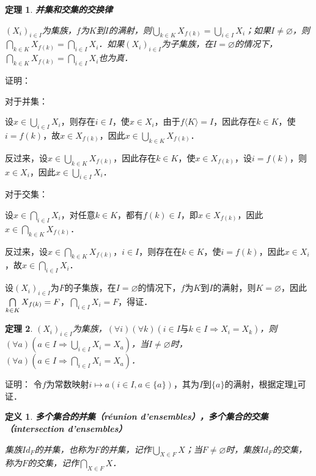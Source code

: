 \documentclass[12pt, a4paper, oneside]{book}
\newtheorem{theo}{定理}
\newtheorem{de}{定义}
\begin{document}
			\begin{theo}\label{theo23}
				\textbf{并集和交集的交换律}
				\par
				$(X_i)_{i\in I}$为集族，$f$为$K$到$I$的满射，则$\bigcup\limits_{k\in K}X_{f(k)}=\bigcup\limits_{i\in I}X_i$；如果$I\neq \varnothing$，则$\bigcap\limits_{k\in K}X_{f(k)}=\bigcap\limits_{i\in I}X_i$．如果$(X_i)_{i\in I}$为子集族，在$I=\varnothing$的情况下，$\bigcap\limits_{k\in K}X_{f(k)}=\bigcap\limits_{i\in I}X_i$也为真．
			\end{theo}
			证明：
			\par
			对于并集：
			\par
			设$x\in \bigcup\limits_{i\in I}X_i$，则存在$i\in I$，使$x\in X_i$，由于$f\langle K\rangle=I$，因此存在$k\in K$，使$i=f(k)$，故$x\in X_{f(k)}$，因此$x\in \bigcup\limits_{k\in K}X_{f(k)}$．
			\par
			反过来，设$x\in \bigcup\limits_{k\in K}X_{f(k)}$，因此存在$k\in K$，使$x\in X_{f(k)}$，设$i=f(k)$，则$x\in X_i$，因此$x\in \bigcup\limits_{i\in I}X_i$．
			\par
			对于交集：
			\par
			设$x\in \bigcap\limits_{i\in I}X_i$，对任意$k\in K$，都有$f(k)\in I$，即$x\in X_{f(k)}$，因此$x\in \bigcap\limits_{k\in K}X_{f(k)}$．
			\par
			反过来，设$x\in \bigcap\limits_{k\in K}X_{f(k)}$，$i\in I$，则存在在$k\in K$，使$i=f(k)$，因此$x\in X_i$，故$x\in \bigcap\limits_{i\in I}X_i$．
			\par
			设$(X_i)_{i\in I}$为$F$的子集族，在$I=\varnothing$的情况下，$f$为$K$到$I$的满射，则$K=\varnothing$，因此$\bigcap\limits_{k\in K}X_{f(k)}\\=F$，$\bigcap\limits_{i\in I}X_i=F$，得证．

			\begin{theo}\label{theo24}
				$(X_i)_{i\in I}$为集族，$(\forall i)(\forall k)(i\in I\text{与}k\in I\Rightarrow X_i=X_k)$，则$(\forall a)(a\in I\Rightarrow \bigcup\limits_{i\in I}X_i=X_a)$，当$I\neq \varnothing$时，$(\forall a)(a\in I\Rightarrow \bigcap\limits_{i\in I}X_i=X_a)$．
			\end{theo}
			证明：
			令$f$为常数映射$i\mapsto a(i\in I, a\in \{a\})$，其为$I$到$\{a\}$的满射，根据定理\ref{theo23}可证．

			\begin{de}
				\textbf{多个集合的并集（réunion d'ensembles），多个集合的交集（intersection d'ensembles）}
				\hfill\par
				集族$Id_F$的并集，也称为$F$的并集，记作$\bigcup\limits_{X\in F}X$；当$F\neq \varnothing$时，集族$Id_F$的交集，称为$F$的交集，记作$\bigcap\limits_{X\in F}X$．
			\end{de}
\end{document}
